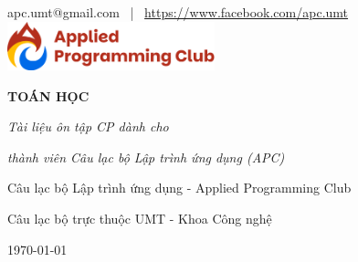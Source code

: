 \begin{titlepage}
\thispagestyle{empty}
\centering

\vspace*{1cm}

{\large apc.umt@gmail.com \, | \, \url{https://www.facebook.com/apc.umt}}\\[1cm]

\includegraphics[width=6cm]{../resource/img/logo.png}\\[3.5cm]
{\fontsize{36}{40}\selectfont\bfseries TOÁN HỌC\par} 
\vspace{0.6cm}
{\fontsize{18}{22}\selectfont\itshape Tài liệu ôn tập CP dành cho \par}
{\fontsize{18}{22}\selectfont\itshape thành viên Câu lạc bộ Lập trình ứng dụng (APC)\par}
\vspace{5cm}

{\Large Câu lạc bộ Lập trình ứng dụng - Applied Programming Club\par}
\vspace{0.4cm}
{\large Câu lạc bộ trực thuộc UMT - Khoa Công nghệ\par}

\vspace{8cm}

{\Large \today\par}

\vfill
\end{titlepage}
